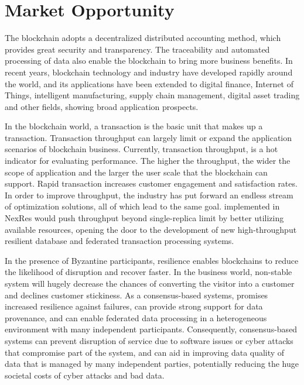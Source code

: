 \section{Market Opportunity}
\par The blockchain adopts a decentralized distributed accounting method, which provides great security 
and transparency. The traceability and automated processing of data also enable the blockchain to 
bring more business benefits. In recent years, blockchain technology and industry have developed 
rapidly around the world\cite{gupta2021fault, bitcoin, ethereum, hotstuff}, and its applications have been extended to digital finance, Internet of 
Things, intelligent manufacturing, supply chain management, digital asset trading and other fields, 
showing broad application prospects.

\par In the blockchain world, a transaction is the basic unit that makes up a transaction. Transaction 
throughput can largely limit or expand the application scenarios of blockchain business. Currently, 
transaction throughput, is a hot indicator for evaluating performance. The higher the throughput, 
the wider the scope of application and the larger the user scale that the blockchain can support. 
Rapid transaction increases customer engagement and satisfaction rates. In order to improve throughput, 
the industry has put forward an endless stream of optimization solutions, all of which lead to the same 
goal. \RCC{}\cite{rcc} implemented in NexRes would push throughput beyond single-replica limit by better 
utilizing available resources, opening the door to the development of new high-throughput resilient 
database and federated transaction processing systems.

\par In the presence of Byzantine participants\cite{lao2020survey}, resilience enables blockchains to 
reduce the likelihood of disruption and recover faster. In the business 
world, non-stable system will hugely decrease the chances of converting the visitor into a customer 
and declines customer stickiness. As a consensus-based systems, \RCC{} promises increased resilience against 
failures, can provide strong support for data provenance, and can enable federated data processing in a 
heterogeneous environment with many independent participants. Consequently, consensus-based systems can 
prevent disruption of service due to software issues or cyber attacks that compromise part of the system, 
and can aid in improving data quality of data that is managed by many independent parties, potentially 
reducing the huge societal costs of cyber attacks and bad data.
